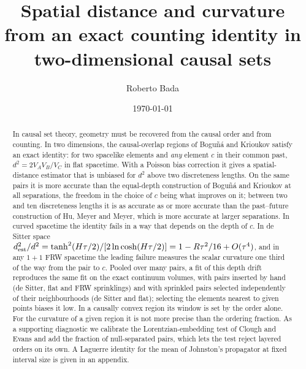 \documentclass[prd,twocolumn,superscriptaddress,nofootinbib,amsmath,amssymb,floatfix]{revtex4-2}
\begin{document}
\title{Spatial distance and curvature from an exact counting identity in two-dimensional causal sets}

\author{Roberto Bada}

\date{\today}

\begin{abstract}
In causal set theory, geometry must be recovered from the causal order and from counting. In two dimensions, the causal-overlap regions of Bogu\~n\'a and Krioukov satisfy an exact identity: for two spacelike elements and \emph{any} element $c$ in their common past, $d^2=2V_AV_B/V_C$ in flat spacetime. With a Poisson bias correction it gives a spatial-distance estimator that is unbiased for $d^2$ above two discreteness lengths. On the same pairs it is more accurate than the equal-depth construction of Bogu\~n\'a and Krioukov at all separations, the freedom in the choice of $c$ being what improves on it; between two and ten discreteness lengths it is as accurate as or more accurate than the past--future construction of Hu, Meyer and Meyer, which is more accurate at larger separations. In curved spacetime the identity fails in a way that depends on the depth of $c$. In de Sitter space $d^2_{\rm est}/d^2=\tanh^2(H\tau/2)/[2\ln\cosh(H\tau/2)]=1-R\tau^2/16+O(\tau^4)$, and in any $1+1$ FRW spacetime the leading failure measures the scalar curvature one third of the way from the pair to $c$. Pooled over many pairs, a fit of this depth drift reproduces the same fit on the exact continuum volumes, with pairs inserted by hand (de Sitter, flat and FRW sprinklings) and with sprinkled pairs selected independently of their neighbourhoods (de Sitter and flat); selecting the elements nearest to given points biases it low. In a causally convex region its window is set by the order alone. For the curvature of a given region it is not more precise than the ordering fraction. As a supporting diagnostic we calibrate the Lorentzian-embedding test of Clough and Evans and add the fraction of null-separated pairs, which lets the test reject layered orders on its own. A Laguerre identity for the mean of Johnston's propagator at fixed interval size is given in an appendix.
\end{abstract}

\maketitle
\end{document}
